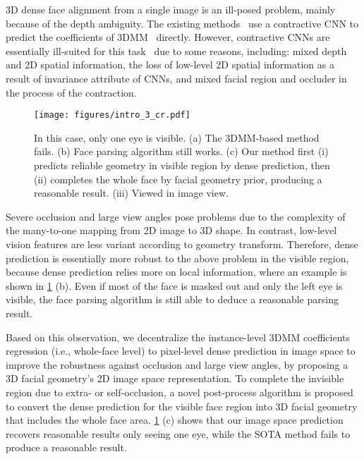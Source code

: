 \documentclass[10pt,twocolumn,letterpaper]{article}
\begin{document}
3D dense face alignment from a single image is an ill-posed problem, mainly because of the depth ambiguity. 
The existing methods~\cite{tran2017regressing, deng2019accurate, shang2020self, DECA:Siggraph2021, sanyal2019learning} use a contractive CNN to predict the coefficients of 3DMM~\cite{blanz1999morphable} directly. However, contractive CNNs are essentially ill-suited for this task~\cite{koizumi2020look} due to some reasons, including: mixed depth and  2D spatial information, the loss of low-level 2D spatial information as a result of invariance attribute of CNNs, and mixed facial region and occluder in the process of the contraction. 



\begin{figure}[t]
  \centering
   \texttt{[image: figures/intro\_3\_cr.pdf]}
   \caption{In this case, only one eye is visible. (a) The 3DMM-based method fails. (b) Face parsing algorithm \cite{yu2018bisenet} still works. (c) Our method first (i) predicts reliable geometry in visible region by dense prediction, then (ii) completes the whole face by facial geometry prior, producing a reasonable result. (iii) Viewed in image view.}
   \label{fig:intro}
\end{figure}



Severe occlusion and large view angles pose problems due to the complexity of the many-to-one mapping from 2D image to 3D shape. In contrast, low-level vision features are less variant according to geometry transform. Therefore, dense prediction is essentially more robust to the above problem in the visible region, because dense prediction relies more on local information, where an example is shown in \cref{fig:intro} (b). Even if most of the face is masked out and only the left eye is visible, the face parsing algorithm is still able to deduce a reasonable parsing result.

Based on this observation, we decentralize the instance-level 3DMM coefficients regression (i.e., whole-face level) to pixel-level dense prediction in image space to improve the robustness against occlusion and large view angles, by proposing a 3D facial geometry's 2D image space representation. 
To complete the invisible region due to extra- or self-occlusion, a novel post-process algorithm is proposed to convert the dense prediction for the visible face region into 3D facial geometry that includes the whole face area. 
\cref{fig:intro} (c) shows that our image space prediction recovers reasonable results only seeing one eye, while the SOTA method fails to produce a reasonable result. 
\end{document}
